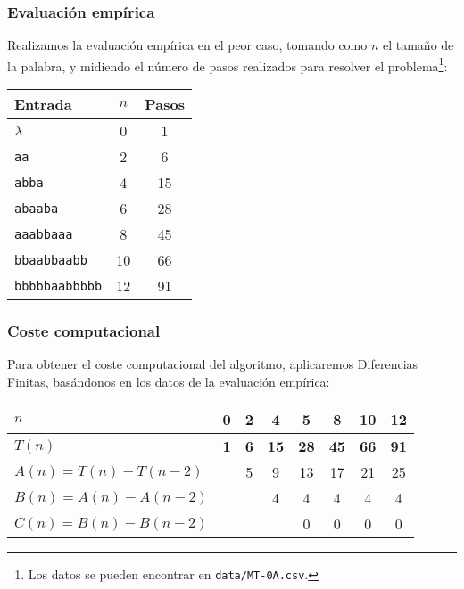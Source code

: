 \subsubsection*{Evaluación empírica}
Realizamos la evaluación empírica en el peor caso, tomando como $n$ el tamaño de la palabra, y midiendo el número de pasos realizados para resolver el problema\footnote{Los datos se pueden encontrar en \texttt{data/MT-0A.csv}.}:

\begin{table}[h]
    \centering
    \begin{tabular}{lcc}
        Entrada & $n$ & Pasos \\
        \hline
        $\lambda$               & 0  & 1  \\
        \texttt{aa}             & 2  & 6  \\
        \texttt{abba}           & 4  & 15 \\
        \texttt{abaaba}         & 6  & 28 \\
        \texttt{aaabbaaa}       & 8  & 45 \\
        \texttt{bbaabbaabb}     & 10 & 66 \\
        \texttt{bbbbbaabbbbb}   & 12 & 91
    \end{tabular}
\end{table}


\subsubsection*{Coste computacional}
Para obtener el coste computacional del algoritmo, aplicaremos Diferencias Finitas, basándonos en los datos de la evaluación empírica:

\begin{table}[H]
    \centering
    \begin{tabular}{|l|c|c|c|c|c|c|c|}
        \hline
        $n$ & \textbf{0} & \textbf{2} & \textbf{4} & \textbf{5} & \textbf{8} & \textbf{10} & \textbf{12} \\ \hline
        $T(n)$ & \textbf{1} & \textbf{6} & \textbf{15} & \textbf{28} & \textbf{45} & \textbf{66} & \textbf{91} \\ \hline
        \hline
        $A(n) = T(n) - T(n-2)$ &    &  5 &  9 & 13 & 17 & 21 & 25 \\ \hline
        $B(n) = A(n) - A(n-2)$ &    &    &  4 &  4 &  4 &  4 &  4 \\ \hline
        $C(n) = B(n) - B(n-2)$ &    &    &    &  0 &  0 &  0 &  0 \\ \hline
    \end{tabular}
    \label{tab:0A}
\end{table}

